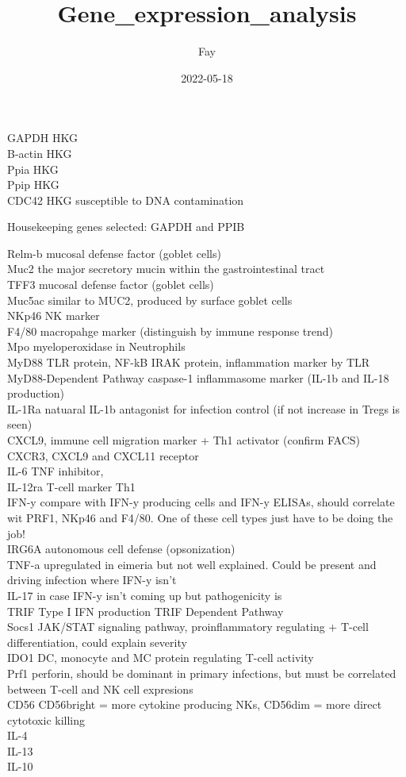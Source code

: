 \documentclass[
]{article}
\title{Gene\_expression\_analysis}
\author{Fay}
\date{2022-05-18}
\begin{document}
\maketitle

GAPDH HKG\\
B-actin HKG\\
Ppia HKG\\
Ppip HKG\\
CDC42 HKG susceptible to DNA contamination

Housekeeping genes selected: GAPDH and PPIB

Relm-b mucosal defense factor (goblet cells)\\
Muc2 the major secretory mucin within the gastrointestinal tract\\
TFF3 mucosal defense factor (goblet cells)\\
Muc5ac similar to MUC2, produced by surface goblet cells\\
NKp46 NK marker\\
F4/80 macropahge marker (distinguish by immune response trend)\\
Mpo myeloperoxidase in Neutrophils\\
MyD88 TLR protein, NF-kB IRAK protein, inflammation marker by TLR
MyD88-Dependent Pathway caspase-1 inflammasome marker (IL-1b and IL-18
production)\\
IL-1Ra natuaral IL-1b antagonist for infection control (if not increase
in Tregs is seen)\\
CXCL9, immune cell migration marker + Th1 activator (confirm FACS)\\
CXCR3, CXCL9 and CXCL11 receptor\\
IL-6 TNF inhibitor,\\
IL-12ra T-cell marker Th1\\
IFN-y compare with IFN-y producing cells and IFN-y ELISAs, should
correlate wit PRF1, NKp46 and F4/80. One of these cell types just have
to be doing the job!\\
IRG6A autonomous cell defense (opsonization)\\
TNF-a upregulated in eimeria but not well explained. Could be present
and driving infection where IFN-y isn't\\
IL-17 in case IFN-y isn't coming up but pathogenicity is\\
TRIF Type I IFN production TRIF Dependent Pathway\\
Socs1 JAK/STAT signaling pathway, proinflammatory regulating + T-cell
differentiation, could explain severity\\
IDO1 DC, monocyte and MC protein regulating T-cell activity\\
Prf1 perforin, should be dominant in primary infections, but must be
correlated between T-cell and NK cell expresions\\
CD56 CD56bright = more cytokine producing NKs, CD56dim = more direct
cytotoxic killing\\
IL-4\\
IL-13\\
IL-10
\end{document}
